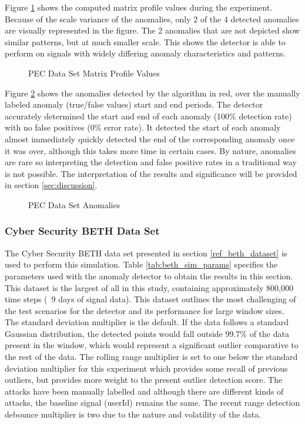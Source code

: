 Figure \ref{fig:pec_mp_hist} shows the computed matrix profile values during the experiment. Because of the scale variance of the anomalies, only 2 of the 4 detected anomalies are visually represented in the figure. The 2 anomalies that are not depicted show similar patterns, but at much smaller scale. This shows the detector is able to perform on signals with widely differing anomaly characteristics and patterns.

\begin{figure}[H]
    \centering
    
    \caption{PEC Data Set Matrix Profile Values}
    \label{fig:pec_mp_hist}
\end{figure}

Figure \ref{fig:pec_outliers} shows the anomalies detected by the algorithm in red, over the manually labeled anomaly (true/false values) start and end periods. The detector accurately determined the start and end of each anomaly (100\% detection rate) with no false positives (0\% error rate). It detected the start of each anomaly almost immediately quickly detected the end of the corresponding anomaly once it was over, although this takes more time in certain cases. By nature, anomalies are rare so interpreting the detection and false positive rates in a traditional way is not possible. The interpretation of the results and significance will be provided in section \ref{sec:discussion}.
 
\begin{figure}[H]
    \centering
    
    \caption{PEC Data Set Anomalies}
    \label{fig:pec_outliers}
\end{figure}

\subsubsection{Cyber Security BETH Data Set}
\label{ref_results_beth_sim}
The Cyber Security BETH data set presented in section \ref{ref_beth_dataset} is used to perform this simulation. Table \ref{tab:beth_sim_params} specifies the parameters used with the anomaly detector to obtain the results in this section. This dataset is the largest of all in this study, containing approximately 800,000 time steps (~9 days of signal data). This dataset outlines the most challenging of the test scenarios for the detector and its performance for large window sizes. The standard deviation multiplier is the default. If the data follows a standard Gaussian distribution, the detected points would fall outside 99.7\% of the data present in the window, which would represent a significant outlier comparative to the rest of the data. The rolling range multiplier is set to one below the standard deviation multiplier for this experiment which provides some recall of previous outliers, but provides more weight to the present outlier detection score. The attacks have been manually labelled and although there are different kinds of attacks, the baseline signal (userId) remains the same. The recent range detection debounce multiplier is two due to the nature and volatility of the data.

